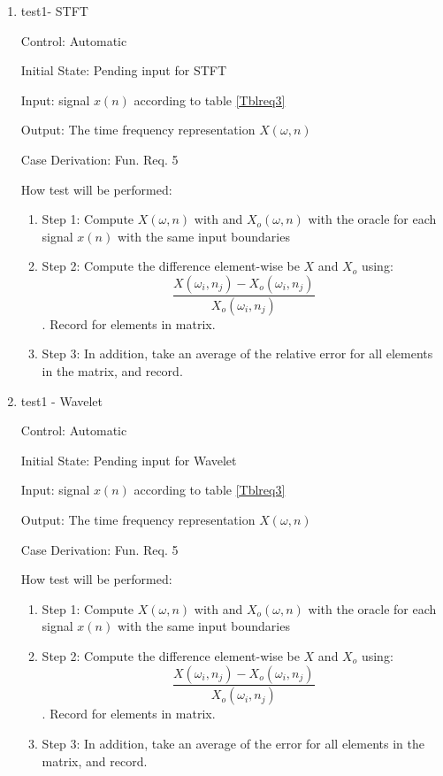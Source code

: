 \documentclass[12pt, titlepage]{article}
\begin{document}
\begin{enumerate}

\item{test1- STFT \\}

Control: Automatic
					
Initial State: Pending input for STFT
					
Input: signal $x(n)$ according to table \ref{Tblreq3}
					
Output: The time frequency representation $X(\omega, n)$

Case Derivation: Fun. Req. 5
					
How test will be performed: 
\begin{enumerate}
\item{Step 1:} Compute $X(\omega, n)$ with \progname{} and $X_o(\omega, n)$ with the oracle for each signal $x(n)$ with the same input boundaries
\item{Step 2:} Compute the difference element-wise be $X$ and $X_o$ using:
\[ \frac{X(\omega_i, n_j) - X_o(\omega_i, n_j)}{X_o(\omega_i, n_j)} \] .
Record for elements in matrix.
\item{Step 3:} In addition, take an average of the relative error for all elements in the matrix, and record.
\end{enumerate}

\item{test1 - Wavelet\\}

Control: Automatic
					
Initial State: Pending input for Wavelet
					
Input: signal $x(n)$ according to table \ref{Tblreq3}
					
Output: The time frequency representation $X(\omega, n)$

Case Derivation: Fun. Req. 5
					
How test will be performed: 
\begin{enumerate}
\item{Step 1:} Compute $X(\omega, n)$ with \progname{} and $X_o(\omega, n)$ with the oracle for each signal $x(n)$ with the same input boundaries
\item{Step 2:} Compute the difference element-wise be $X$ and $X_o$ using:
\[ \frac{X(\omega_i, n_j) - X_o(\omega_i, n_j)}{X_o(\omega_i, n_j)} \] .
Record for elements in matrix.
\item{Step 3:} In addition, take an average of the error for all elements in the matrix, and record.
\end{enumerate}


\end{enumerate}
\end{document}
